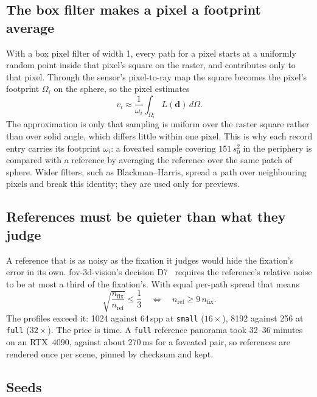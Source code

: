 \documentclass[11pt,a4paper]{article}
\newcommand{\code}[1]{\texttt{\small #1}}
\newcommand{\vb}[1]{\mathbf{#1}}
\begin{document}
\subsection{The box filter makes a pixel a footprint average}\label{sec:box}

With a box pixel filter of width 1, every path for a pixel starts at a uniformly random point inside that pixel's
square on the raster, and contributes only to that pixel. Through the sensor's pixel-to-ray map the square
becomes the pixel's footprint $\Omega_i$ on the sphere, so the pixel estimates
\begin{equation}\label{eq:box}
v_i \approx \frac{1}{\omega_i}\int_{\Omega_i} L(\vb{d})\,d\Omega .
\end{equation}
The approximation is only that sampling is uniform over the raster square rather than over solid angle, which
differs little within one pixel. This is why each record entry carries its footprint $\omega_i$: a foveated
sample covering $151\,s_0^2$ in the periphery is compared with a reference by averaging the reference over the
same patch of sphere. Wider filters, such as Blackman--Harris, spread a path over neighbouring pixels and break
this identity; they are used only for previews.

\subsection{References must be quieter than what they judge}\label{sec:refs}

A reference that is as noisy as the fixation it judges would hide the fixation's error in its own.
fov-3d-vision's decision D7~\cite{fov3dDec} requires the reference's relative noise to be at most a third of the
fixation's. With equal per-path spread that means
\begin{equation}\label{eq:d7}
\sqrt{\frac{n_{\mathrm{fix}}}{n_{\mathrm{ref}}}} \le \frac13
\quad\Longleftrightarrow\quad n_{\mathrm{ref}} \ge 9\,n_{\mathrm{fix}} .
\end{equation}
The profiles exceed it: 1024 against 64\,spp at \code{small} ($16\times$), 8192 against 256 at \code{full}
($32\times$). The price is time. A \code{full} reference panorama took 32--36 minutes on an RTX~4090, against
about 270\,ms for a foveated pair, so references are rendered once per scene, pinned by checksum and kept.

\subsection{Seeds}\label{sec:seeds}
\end{document}
